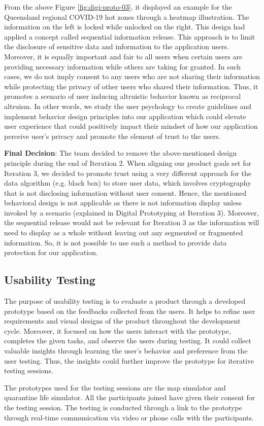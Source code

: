       \par From the above Figure \ref{fig:digi-proto-03}, it displayed an example for the Queensland regional COVID-19 hot zones through a heatmap illustration. The information on the left is locked while unlocked on the right. This design had applied a concept called sequential information release. This approach is to limit the disclosure of sensitive data and information to the application users. Moreover, it is equally important and fair to all users when certain users are providing necessary information while others are taking for granted. In such cases, we do not imply consent to any users who are not sharing their information while protecting the privacy of other users who shared their information. Thus, it promotes a scenario of user inducing altruistic behavior known as reciprocal altruism. In other words, we study the user psychology to create guidelines and implement behavior design principles into our application which could elevate user experience that could positively impact their mindset of how our application perceive user’s privacy and promote the element of trust to the users.
      \par \textbf{Final Decision}: The team decided to remove the above-mentioned design principle during the end of Iteration 2.
      When aligning our product goals set for Iteration 3, we decided to promote trust using a very different
      approach for the data algorithm (e.g. black box) to store user data, which involves cryptography that
      is not disclosing information without user consent. Hence, the mentioned behavioral design is not
      applicable as there is not information display unless invoked by a scenario (explained in Digital
      Prototyping at Iteration 3). Moreover, the sequential release would not be relevant for Iteration 3 as the
      information will need to display as a whole without leaving out any segmented or fragmented
      information. So, it is not possible to use such a method to provide data protection for our application.

  \subsection{Usability Testing}
    \par The purpose of usability testing is to evaluate a product through a developed prototype based on the feedbacks collected from the users. It helps to refine user requirements and visual designs of the product throughout the development cycle. Moreover, it focused on how the users interact with the prototype, completes the given tasks, and observe the users during testing. It could collect valuable insights through learning the user’s behavior and preference from the user testing. Thus, the insights could further improve the prototype for iterative testing sessions.
    \par The prototypes used for the testing sessions are the map simulator and quarantine life simulator. All the participants joined have given their consent for the testing session. The testing is conducted through a link to the prototype through real-time communication via video or phone calls with the participants.
    
